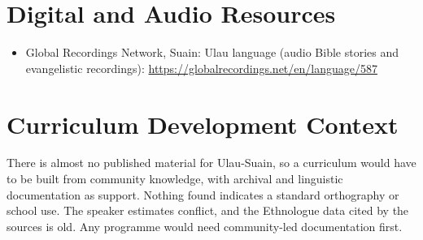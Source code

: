 \documentclass[12pt]{article}
\begin{document}
\section{Digital and Audio Resources}
\begin{itemize}
\item Global Recordings Network, Suain: Ulau language (audio Bible stories and evangelistic recordings): \url{https://globalrecordings.net/en/language/587}
\end{itemize}

\section{Curriculum Development Context}
There is almost no published material for Ulau-Suain, so a curriculum would have to be built from community knowledge, with archival and linguistic documentation as support. Nothing found indicates a standard orthography or school use. The speaker estimates conflict, and the Ethnologue data cited by the sources is old. Any programme would need community-led documentation first.
\end{document}
